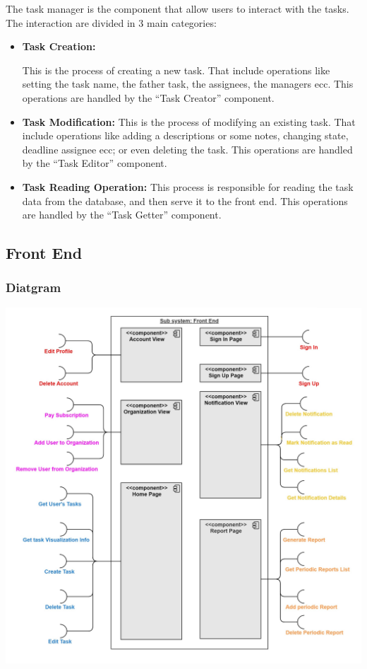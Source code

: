 \documentclass{article}
\begin{document}
The task manager is the component that allow users to interact with the tasks.
The interaction are divided in 3 main categories:
\begin{itemize}
    \item \textbf{Task Creation: }
    
    This is the process of creating a new task. That include operations like 
    setting the task name, the father task, the assignees, the managers ecc.
    This operations are handled by the ``Task Creator'' component.
    \item \textbf{Task Modification: }
    This is the process of modifying an existing task. That include operations like adding a descriptions or some notes,
    changing state, deadline assignee ecc; or even deleting the task.
    This operations are handled by the ``Task Editor'' component.
    \item \textbf{Task Reading Operation: }
    This process is responsible for reading the task data from the database, and then serve it to the front end.
    This operations are handled by the ``Task Getter'' component.
\end{itemize}

\subsection{Front End}
\subsubsection{Diatgram}
\includegraphics[width=\textwidth,height=\textheight,keepaspectratio]{images/component_diagram/front_end.jpg}
\end{document}
